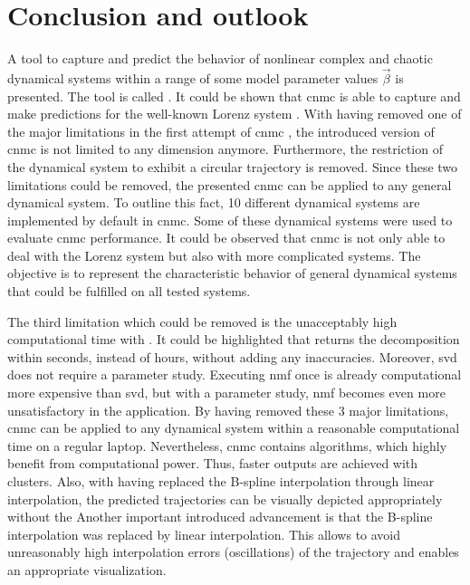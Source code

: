 \chapter{Conclusion and outlook}
A tool to capture and predict the behavior of nonlinear complex and chaotic dynamical systems within a range of some model parameter values $\vec{\beta}$ is presented.
The tool is called .
It could be shown that \gls{cnmc} is able to capture and make predictions for the well-known Lorenz system \cite{lorenz1963deterministic}.
With having removed one of the major limitations in the first attempt of \gls{cnmc} \cite{Max2021}, the introduced version of \gls{cnmc} is not limited to any dimension anymore. 
Furthermore, the restriction of the dynamical system to exhibit a circular trajectory is removed. 
Since these two limitations could be removed, the presented \gls{cnmc} can be applied to any general dynamical system.
To outline this fact, 10 different dynamical systems are implemented by default in \gls{cnmc}.
Some of these dynamical systems were used to evaluate \gls{cnmc} performance.
It could be observed that \gls{cnmc} is not only able to deal with the Lorenz system but also with more complicated systems.
The objective is to represent the characteristic behavior of general dynamical systems that could be fulfilled on all tested systems.\newline 

The third limitation which could be removed is the unacceptably high computational time with . 
It could be highlighted that  returns the decomposition within seconds, instead of hours, without adding any inaccuracies.
Moreover, \gls{svd} does not require a parameter study. 
Executing \gls{nmf} once is already computational more expensive than \gls{svd}, but with a parameter study, \gls{nmf} becomes even more unsatisfactory in the application.
By having removed these 3 major limitations, \gls{cnmc} can be applied to any dynamical system within a reasonable computational time on a regular laptop.
Nevertheless, \gls{cnmc} contains algorithms, which highly benefit from computational power. Thus, faster outputs are achieved with clusters.
Also, with having replaced the B-spline interpolation through linear interpolation, the predicted trajectories can be visually depicted appropriately without the 
Another important introduced advancement is that the B-spline interpolation was replaced by linear interpolation. This allows to avoid unreasonably high interpolation errors (oscillations) of the trajectory and enables an appropriate visualization.
\newline


